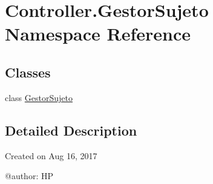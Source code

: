 \hypertarget{namespace_controller_1_1_gestor_sujeto}{}\section{Controller.\+Gestor\+Sujeto Namespace Reference}
\label{namespace_controller_1_1_gestor_sujeto}
\subsection*{Classes}
\begin{DoxyCompactItemize}
\item 
class \hyperlink{class_controller_1_1_gestor_sujeto_1_1_gestor_sujeto}{Gestor\+Sujeto}
\end{DoxyCompactItemize}


\subsection{Detailed Description}
\begin{DoxyVerb}Created on Aug 16, 2017

@author: HP
\end{DoxyVerb}
 